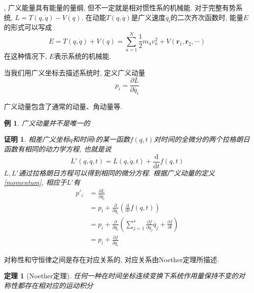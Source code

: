 \documentclass[a4paper,11pt]{article}
\theoremstyle{mystyle}
\newtheorem{theorem}{\hspace{2em}定理}[section]
\newtheorem{Proof}{\hspace{2em}证明}[section]
\newtheorem{example}{\hspace{2em}例}[section]
\begin{document}
, 广义能量具有能量的量纲, 但不一定就是相对惯性系的机械能. 对于完整有势系统, $L=T(q,\dot{q})-V(q)$. 在动能$T(q,\dot{q})$是广义速度$\dot{q_i}$的二次齐次函数时, 能量$E$的形式可以写成
\begin{equation*}
  E=T(q,\dot{q})+V(q)=\sum_{a=1}^{N}\frac{1}{2}m_av_a^2+V(\mathbf{r}_1,\mathbf{r}_2,\cdots)
\end{equation*}
在这种情况下, $E$表示系统的机械能.

\begin{definition}[广义动量]
  当我们用广义坐标去描述系统时, 定义广义动量
  \begin{equation}\label{momentum}
    p_i=\frac{\partial L}{\partial{\dot{q_i}}}
  \end{equation}
\end{definition}
广义动量包含了通常的动量、角动量等.
\begin{example}
  广义动量并不是唯一的
\end{example}
\begin{Proof}
  相差广义坐标$q$和时间$t$的某一函数$f(q,t)$对时间的全微分的两个拉格朗日函数有相同的动力学方程, 也就是说
  \begin{equation*}
    L'(q,\dot{q},t)=L(q,\dot{q},t)+\frac{\mathrm{d}}{\mathrm{d}t}f(q,t)
  \end{equation*}
  $L,L'$通过拉格朗日方程可以得到相同的微分方程. 根据广义动量的定义\eqref{momentum}, 相应于$L'$有
  \begin{equation*}
    \begin{split}
       p'_i & =\frac{\partial L}{\partial{\dot{q_i}}} \\
         & =p_i+\frac{\partial}{\partial\dot{q_i}}\left(\frac{\mathrm{d}}{\mathrm{d}t}f(q,t)\right) \\
         & =p_i+\frac{\partial}{\partial{\dot{q_i}}}\left(\sum_{j=1}^{s}\frac{\partial f}{\partial{q_j}}\dot{q_j}+\frac{\partial f}{\partial t}\right) \\
         & =p_i+\frac{\partial{f}}{\partial{q_i}}
    \end{split}
  \end{equation*}
\end{Proof}
对称性和守恒律之间是存在对应关系的, 对应关系由Noether定理所描述.
\begin{theorem}[Noether定理]
  任何一种在时间坐标连续变换下系统作用量保持不变的对称性都存在相对应的运动积分
\end{theorem}
\end{document}
